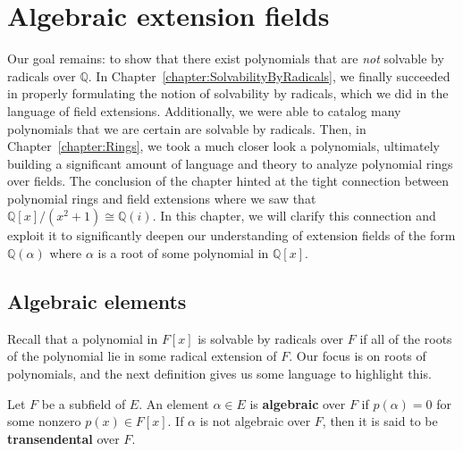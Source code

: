 \chapter{Algebraic extension fields}
\label{chapter:AlgebraicExtensions}
\thispagestyle{empty}


Our goal remains: to show that there exist polynomials that are \emph{not} solvable by radicals over $\mathbb{Q}$. In Chapter~\ref{chapter:SolvabilityByRadicals}, we finally succeeded in properly formulating the notion of solvability by radicals, which we did in the language of field extensions. Additionally, we were able to catalog many polynomials that we are certain are solvable by radicals. Then, in Chapter~\ref{chapter:Rings}, we took a much closer look a polynomials, ultimately building a significant amount of language and theory to analyze polynomial rings over fields. The conclusion of the chapter hinted at the tight connection between polynomial rings and field extensions where we saw that $\mathbb{Q}[x]/(x^2+1) \cong \mathbb{Q}(i)$. In this chapter, we will clarify this connection and exploit it to significantly deepen our understanding of extension fields of the form $\mathbb{Q}(\alpha)$ where $\alpha$ is a root of some polynomial in $\mathbb{Q}[x]$. 


\section{Algebraic elements}

Recall that a polynomial in $F[x]$ is solvable by radicals over $F$ if all of the roots of the polynomial lie in some radical extension of $F$. Our focus is on roots of polynomials, and the next definition gives us some language to highlight this.

\begin{definition}
Let $F$ be a subfield of $E$. An element $\alpha\in E$ is \textbf{algebraic} over $F$ if $p(\alpha) = 0$ for some nonzero $p(x)\in F[x]$. If $\alpha$ is not algebraic over  $F$, then it is said to be \textbf{transendental} over $F$. 
\end{definition}

